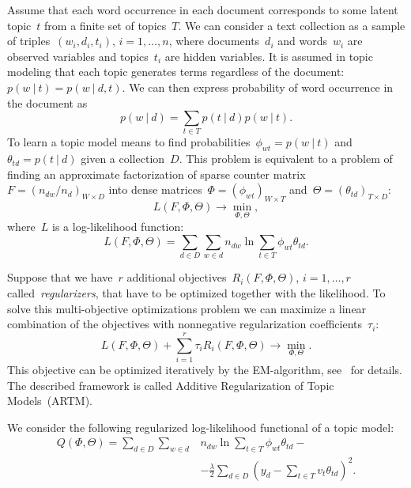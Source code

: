 \documentclass{sig-alternate-2013}
\begin{document}
Assume that each word occurrence in each document corresponds to some latent topic~$t$
from a finite set of topics~$T$.
We can consider a text collection as a sample of triples~$(w_i, d_i, t_i)$, $i = 1, \dots, n$,
where documents~$d_i$ and words~$w_i$ are observed variables and topics~$t_i$
are hidden variables.
It is assumed in topic modeling that each topic generates terms regardless
of the document: $p(w\ |\ t) = p(w\ |\ d, t)$.
We can then express probability of word occurrence in the document as
\[
    p(w\ |\ d)
    =
    \sum_{t \in T}
        p(t\ |\ d) p(w\ |\ t).
\]
To learn a topic model means to find probabilities~$\phi_{wt} = p(w\ |\ t)$
and~$\theta_{td} = p(t\ |\ d)$ given a collection~$D$.
This problem is equivalent to a problem of finding an approximate factorization
of sparse counter matrix~$F = (n_{dw} / n_d)_{W \times D}$ into dense
matrices~$\Phi = (\phi_{wt})_{W \times T}$ and~$\Theta = (\theta_{td})_{T \times D}$:
\[
    L(F, \Phi, \Theta) \to \min_{\Phi, \Theta},
\]
where~$L$ is a log-likelihood function:
\[
    L(F, \Phi, \Theta)
    =
    \sum_{d \in D} \sum_{w \in d}
        n_{dw}
        \ln \sum_{t \in T}
            \phi_{wt} \theta_{td}.
\]

Suppose that we have~$r$ additional objectives~$R_i(F, \Phi, \Theta)$, $i = 1, \dots, r$
called~\emph{regularizers}, that have to be optimized together
with the likelihood.
To solve this multi-objective optimizations problem we can
maximize a linear combination of the objectives with nonnegative
regularization coefficients~$\tau_i$:
\[
    L(F, \Phi, \Theta)
    +
    \sum_{i = 1}^{r} \tau_i R_i(F, \Phi, \Theta)
    \to
    \min_{\Phi, \Theta}.
\]
This objective can be optimized iteratively by the EM-algorithm,
see~\cite{vorontsov14artm} for details.
The described framework is called Additive Regularization
of Topic Models~(ARTM).

We consider the following regularized log-likelihood functional of a topic model:
\begin{align}
\label{eq:mse_reg}
    Q(\Phi, \Theta)
    =
    \sum_{d \in D} \sum_{w \in d}
        &n_{dw}
        \ln \sum_{t \in T}
            \phi_{wt} \theta_{td}
    -\\
    &-\frac{\lambda}{2}
    \sum_{d \in D}
        \left(
            y_d
            -
            \sum_{t \in T}
                v_t \theta_{td}
        \right)^2.\nonumber
\end{align}
\end{document}
